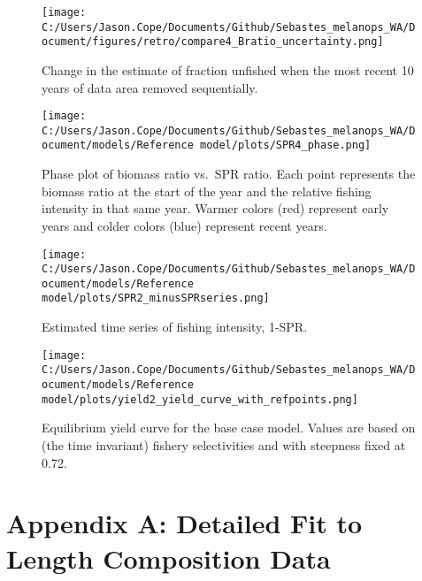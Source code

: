 \documentclass[11pt,
  english,
  letterpaper,
]{article}
\begin{document}
\pagebreak

\begin{figure}
\centering
\texttt{[image: C:/Users/Jason.Cope/Documents/Github/Sebastes\_melanops\_WA/Document/figures/retro/compare4\_Bratio\_uncertainty.png]}
\caption{Change in the estimate of fraction unfished when the most recent 10 years of data area removed sequentially.\label{fig:retro-depl}}
\end{figure}

\newpage

\begin{figure}
\centering
\texttt{[image: C:/Users/Jason.Cope/Documents/Github/Sebastes\_melanops\_WA/Document/models/Reference model/plots/SPR4\_phase.png]}
\caption{Phase plot of biomass ratio vs.~SPR ratio. Each point represents the biomass ratio at the start of the year and the relative fishing intensity in that same year. Warmer colors (red) represent early years and colder colors (blue) represent recent years.\label{fig:phase}}
\end{figure}

\pagebreak

\begin{figure}
\centering
\texttt{[image: C:/Users/Jason.Cope/Documents/Github/Sebastes\_melanops\_WA/Document/models/Reference model/plots/SPR2\_minusSPRseries.png]}
\caption{Estimated time series of fishing intensity, 1-SPR.\label{fig:1-spr}}
\end{figure}

\pagebreak

\begin{figure}
\centering
\texttt{[image: C:/Users/Jason.Cope/Documents/Github/Sebastes\_melanops\_WA/Document/models/Reference model/plots/yield2\_yield\_curve\_with\_refpoints.png]}
\caption{Equilibrium yield curve for the base case model. Values are based on (the time invariant) fishery selectivities and with steepness fixed at 0.72.\label{fig:yield}}
\end{figure}

\pagebreak

\clearpage

\hypertarget{app-a}{%
\section{Appendix A: Detailed Fit to Length Composition Data}\label{app-a}}
\end{document}
